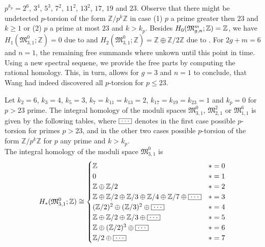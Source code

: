 $p^{k_p} = 2^6$, $3^4$, $5^3$, $7^2$, $11^2$, $13^2$, $17$, $19$ and $23$.
Observe that there might be undetected $p$-torsion of the form $\mathbb Z / p^k \mathbb Z$ in case
(1) $p$ a prime greater then $23$ and $k \ge 1$ or
(2) $p$ a prime at most $23$ and $k > k_p$.
Besides $H_0(\mathfrak{M}^m_{g,n};\mathbb Z) = \mathbb Z$,
we have $H_1(\mathfrak{M}_{3,1}^0;\mathbb Z) = 0$ due to \cite{Powell1978} and $H_2(\mathfrak{M}_{3,1}^0;\mathbb Z) = \mathbb Z \oplus \mathbb Z / 2 \mathbb Z$ due to \cite{Sakasai2012}.
For $2g+m=6$ and $n=1$, the remaining free summands where unkown until this point in time.
Using a new spectral sequene, we provide the free parts by computing the rational homology.
This, in turn, allows for $g=3$ and $n=1$ to conclude, that Wang had indeed discovered all $p$-torsion for $p \le 23$.
\begin{thm*}
    Let $k_2 = 6$, $k_3 = 4$, $k_5 = 3$, $k_7 = k_{11} = k_{13} = 2$, $k_{17} = k_{19} = k_{23} = 1$ and $k_p = 0$ for $p > 23$ prime.
    The integral homology of the moduli spaces $\mathfrak{M}_{3,1}^0$, $\mathfrak{M}_{2,1}^2$ or $\mathfrak{M}_{1,1}^6$ is given by the following tables,
    where $\bldots$ denotes in the first case possible $p$-torsion for primes $p > 23$, 
    and in the other two cases possible $p$-torsion of the form $\mathbb Z / p^k \mathbb Z$ for $p$ any prime and $k > k_p$.
    \\[2pt]
    \noindent The integral homology of the moduli space $\mathfrak{M}_{3,1}^0$ is
    \[
        H_\ast( \mathfrak{M}_{3,1}^0; \mathbb Z ) \cong 
            \begin{cases}
                \mathbb Z           & \ast = 0\\
                0                   & \ast = 1\\
                \mathbb Z \oplus \mathbb Z / 2                                  & \ast = 2\\
                \mathbb Z \oplus \mathbb Z/2 \oplus \mathbb Z/3 \oplus \mathbb Z/4 \oplus \mathbb Z/7 \oplus \bldots & \ast = 3\\
                (\mathbb Z/2)^2 \oplus (\mathbb Z/3)^2  \oplus \bldots          & \ast = 4\\
                \mathbb Z \oplus \mathbb Z/2 \oplus \mathbb Z/3  \oplus \bldots & \ast = 5\\
                \mathbb Z \oplus (\mathbb Z/2)^3  \oplus \bldots                & \ast = 6\\
                \mathbb Z / 2  \oplus \bldots   & \ast = 7\\

\end{cases}\]
\end{thm*}
